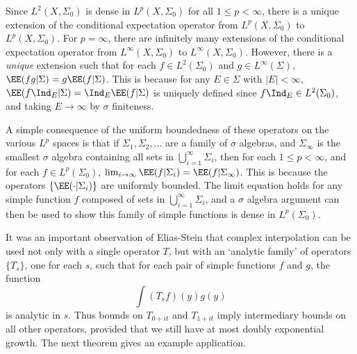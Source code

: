 \begin{example}
Since $L^2(X,\Sigma_0)$ is dense in $L^p(X,\Sigma_0)$ for all $1 \leq p < \infty$, there is a unique extension of the conditional expectation operator from $L^p(X,\Sigma_0)$ to $L^p(X,\Sigma_0)$. For $p = \infty$, there are infinitely many extensions of the conditional expectation operator from $L^\infty(X,\Sigma_0)$ to $L^\infty(X,\Sigma_0)$. However, there is a \emph{unique} extension such that for each $f \in L^2(\Sigma_0)$ and $g \in L^\infty(\Sigma)$, $\EE(fg|\Sigma) = g \EE(f|\Sigma)$. This is because for any $E \in \Sigma$ with $|E| < \infty$, $\EE(f \Ind_E | \Sigma) = \Ind_E \EE(f|\Sigma)$ is uniquely defined since $f \Ind_E \in L^2(\Sigma_0)$, and taking $E \to \infty$ by $\sigma$ finiteness.

A simple consequence of the uniform boundedness of these operators on the various $L^p$ spaces is that if $\Sigma_1, \Sigma_2, \dots$ are a family of $\sigma$ algebras, and $\Sigma_\infty$ is the smallest $\sigma$ algebra containing all sets in $\bigcup_{i = 1}^\infty \Sigma_i$, then for each $1 \leq p < \infty$, and for each $f \in L^p(\Sigma_0)$, $\lim_{i \to \infty} \EE(f|\Sigma_i) = \EE(f|\Sigma_\infty)$. This is because the operators $\{ \EE(\cdot|\Sigma_i) \}$ are uniformly bounded. The limit equation holds for any simple function $f$ composed of sets in $\bigcup_{i = 1}^\infty \Sigma_i$, and a $\sigma$ algebra argument can then be used to show this family of simple functions is dense in $L^p(\Sigma_0)$.
\end{example}

It was an important observation of Elias-Stein that complex interpolation can be used not only with a single operator $T$, but with an `analytic family' of operators $\{ T_s \}$, one for each $s$, such that for each pair of simple functions $f$ and $g$, the function
%
\[ \int (T_s f)(y) g(y) \]
%
is analytic in $s$. Thus bounds on $T_{0+it}$ and $T_{1 + it}$ imply intermediary bounds on all other operators, provided that we still have at most doubly exponential growth. The next theorem gives an example application.

